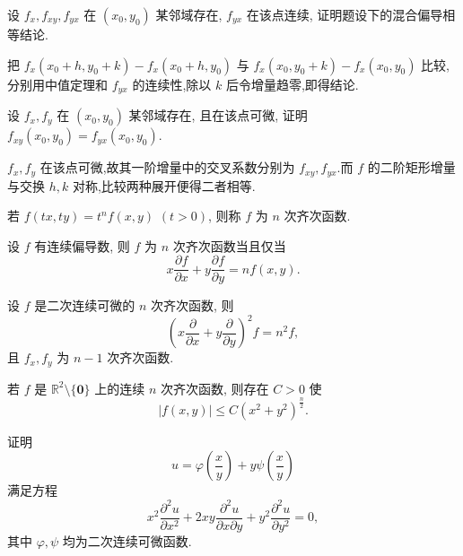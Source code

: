 \begin{example}
    设 $f_x,f_{xy},f_{yx}$ 在 $(x_0,y_0)$ 某邻域存在, $f_{yx}$ 在该点连续, 证明题设下的混合偏导相等结论.
\end{example}
\exampleblank

\begin{solution}
    把 $f_x(x_0+h,y_0+k)-f_x(x_0+h,y_0)$ 与 $f_x(x_0,y_0+k)-f_x(x_0,y_0)$ 比较,分别用中值定理和 $f_{yx}$ 的连续性,除以 $k$ 后令增量趋零,即得结论.
\end{solution}

\begin{example}
    设 $f_x,f_y$ 在 $(x_0,y_0)$ 某邻域存在, 且在该点可微, 证明 $f_{xy}(x_0,y_0)=f_{yx}(x_0,y_0)$.
\end{example}
\exampleblank

\begin{solution}
    $f_x,f_y$ 在该点可微,故其一阶增量中的交叉系数分别为 $f_{xy},f_{yx}$.而 $f$ 的二阶矩形增量与交换 $h,k$ 对称,比较两种展开便得二者相等.
\end{solution}

\begin{definition}
    若 $f(tx,ty)=t^nf(x,y)$ $(t>0)$, 则称 $f$ 为 $n$ 次齐次函数.
\end{definition}

\begin{proposition}[\markstar]
    设 $f$ 有连续偏导数, 则 $f$ 为 $n$ 次齐次函数当且仅当
    \[
        x\dfrac{\partial f}{\partial x}+y\dfrac{\partial f}{\partial y}=nf(x,y).
    \]
\end{proposition}

\begin{proposition}[\markstar]
    设 $f$ 是二次连续可微的 $n$ 次齐次函数, 则
    \[
        \left(x\dfrac{\partial}{\partial x}+y\dfrac{\partial}{\partial y}\right)^2f=n^2f,
    \]
    且 $f_x,f_y$ 为 $n-1$ 次齐次函数.
\end{proposition}

\begin{proposition}
    若 $f$ 是 $\mathbb{R}^2\setminus\{\bm{0}\}$ 上的连续 $n$ 次齐次函数, 则存在 $C>0$ 使
    \[
        |f(x,y)|\leq C(x^2+y^2)^{\frac{n}{2}}.
    \]
\end{proposition}

\begin{example}
    证明
    \[
        u=\varphi\left(\dfrac{x}{y}\right)+y\psi\left(\dfrac{x}{y}\right)
    \]
    满足方程
    \[
        x^2\dfrac{\partial^2u}{\partial x^2}
        +2xy\dfrac{\partial^2u}{\partial x\partial y}
        +y^2\dfrac{\partial^2u}{\partial y^2}=0,
    \]
    其中 $\varphi,\psi$ 均为二次连续可微函数.
\end{example}
\exampleblank

